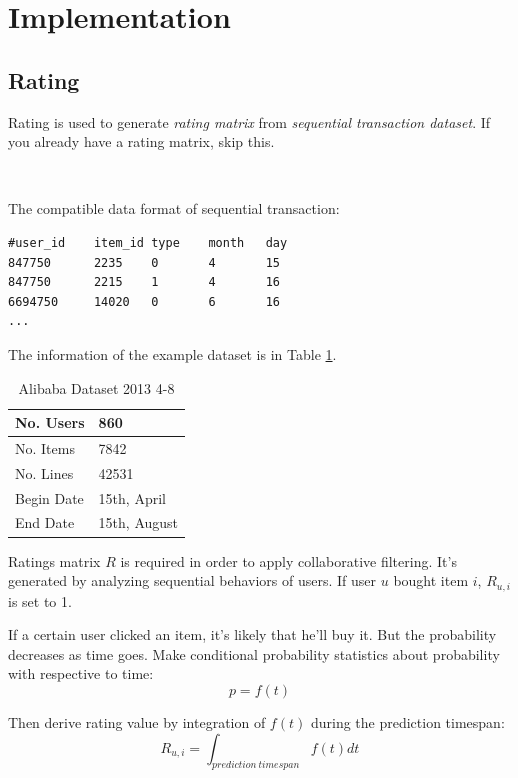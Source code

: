 \documentclass[11pt,a4paper,titlepage]{article}
\begin{document}
\section{Implementation}

\subsection{Rating}

Rating is used to generate \emph{rating matrix} from \emph{sequential transaction dataset}. If you already have a rating matrix, skip this.

~

The compatible data format of sequential transaction:

\begin{lstlisting}
#user_id    item_id type    month   day
847750      2235    0       4       15
847750      2215    1       4       16
6694750     14020   0       6       16
...
\end{lstlisting}


The information of the example dataset is in Table \ref{tab:data-fmt}.

\begin{table}[!h]
\centering
\begin{tabular}{|l|l|}
\hline
No. Users & 860 \\ \hline
No. Items & 7842 \\ \hline
No. Lines & 42531 \\ \hline
Begin Date & 15th, April\\ \hline
End Date & 15th, August\\ \hline
\end{tabular}
\caption{Alibaba Dataset 2013 4-8}
\label{tab:data-fmt}
\end{table}



Ratings matrix $R$ is required in order to apply collaborative filtering. It's generated by analyzing sequential behaviors of users.  If user $u$ bought item $i$, $R_{u,i}$ is set to 1.  

If a certain user clicked an item, it's likely that he'll buy it. But the probability decreases as time goes. Make conditional probability statistics about probability with respective to time:
\begin{equation}
p = f(t)
\end{equation}

Then derive rating value by integration of $f(t)$ during the prediction timespan:
\begin{equation}
R_{u,i} = \int_{prediction~timespan}f(t)dt
\end{equation}
\end{document}
